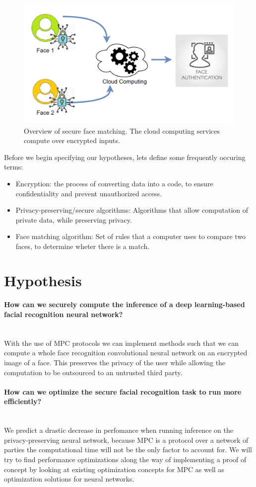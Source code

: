 \begin{figure}[H]
  \includegraphics[scale=0.4]{fig/intro_overview.png}
  \centering
  \caption{Overview of secure face matching. The cloud computing services compute over encrypted inputs.}
  \label{fig:intro_overview}
\end{figure}

Before we begin specifying our hypotheses, lets define some frequently occuring terms:

\begin{itemize}
  \item Encryption: the process of converting data into a code, to ensure confidentiality and prevent unauthorized access.
  \item Privacy-preserving/secure algorithms: Algorithms that allow computation of private data, while preserving privacy.
  \item Face matching algorithm: Set of rules that a computer uses to compare two faces, to determine wheter there is a match.
\end{itemize}

\section{Hypothesis}
\label{chapter:hypothesis}
\paragraph{How can we securely compute the inference of a deep learning-based facial recognition neural network?}\mbox{} \\
With the use of MPC protocols we can implement methods such that we can compute a whole face recognition convolutional neural network on an encrypted image of a face. This preserves the privacy of the user while allowing the computation to be outsourced to an untrusted third party.
\paragraph{How can we optimize the secure facial recognition task to run more efficiently?}\mbox{}
\\
We predict a drastic decrease in perfomance when running inference on the privacy-preserving neural network, because MPC is a protocol over a network of parties the computational time will not be the only factor to account for. We will try to find performance optimizations along the way of implementing a proof of concept by looking at existing optimization concepts for MPC as well as optimization solutions for neural networks.
